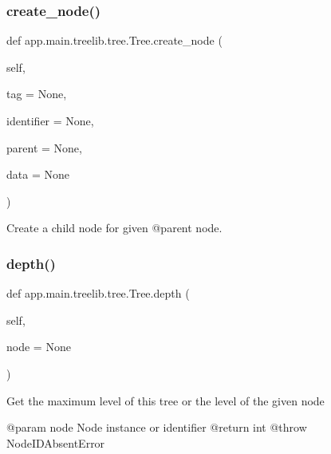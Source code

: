 \subsubsection{\texorpdfstring{create\+\_\+node()}{create\_node()}}
{\footnotesize\ttfamily def app.\+main.\+treelib.\+tree.\+Tree.\+create\+\_\+node (\begin{DoxyParamCaption}\item[{}]{self,  }\item[{}]{tag = {\ttfamily None},  }\item[{}]{identifier = {\ttfamily None},  }\item[{}]{parent = {\ttfamily None},  }\item[{}]{data = {\ttfamily None} }\end{DoxyParamCaption})}

\begin{DoxyVerb}Create a child node for given @parent node.\end{DoxyVerb}
 \mbox{\label{classapp_1_1main_1_1treelib_1_1tree_1_1Tree_a6ded8390652198c807e114ebe34692f6}} 
\subsubsection{\texorpdfstring{depth()}{depth()}}
{\footnotesize\ttfamily def app.\+main.\+treelib.\+tree.\+Tree.\+depth (\begin{DoxyParamCaption}\item[{}]{self,  }\item[{}]{node = {\ttfamily None} }\end{DoxyParamCaption})}

\begin{DoxyVerb}Get the maximum level of this tree or the level of the given node

@param node Node instance or identifier
@return int
@throw NodeIDAbsentError
\end{DoxyVerb}
 \mbox{\label{classapp_1_1main_1_1treelib_1_1tree_1_1Tree_a5414ce6ec942fb619f8ff039113ffa16}} 
